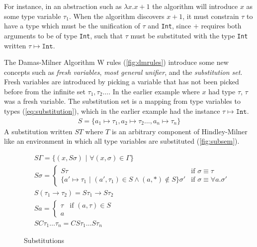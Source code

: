 \documentclass[11pt,oneside,a4paper]{report}
\begin{document}
For instance, in an abstraction such as $\lambda x.x + 1$ the algorithm will introduce $x$ as some type variable $\tau_1$.
When the algorithm discovers $x + 1$, it must constrain $\tau$ to have a type which must be the unification of $\tau$ and \texttt{Int}, since $+$ requires both arguments to be of type \texttt{Int}, such that $\tau$ must be substituted with the type \texttt{Int} written $\tau \mapsto \texttt{Int}$.

The Damas-Milner Algorithm W rules (\autoref{fig:dmrules}) introduce some new concepts such as \textit{fresh variables}, \textit{most general unifier}, and the \textit{substitution set}.
Fresh variables are introduced by picking a variable that has not been picked before from the infinite set $\tau_1, \tau_2 \dots $.
In the earlier example where $x$ had type $\tau$, $\tau$ was a fresh variable.
The substitution set is a mapping from type variables to types (\autoref{eq:substitution}), which in the earlier example had the instance $\tau \mapsto \texttt{Int}$.
\begin{align}
    S = \{ a_1 \mapsto \tau_1, a_2 \mapsto \tau_2 \dots , a_n \mapsto \tau_n \} 
    \label{eq:substitution}
\end{align}
A substitution written $S T$ where $T$ is an arbitrary component of Hindley-Milner like an environment in which all type variables are substituted (\autoref{fig:subsem}).
\begin{figure}
\begin{mdframed}
\begin{align}
    &S \Gamma = \{ (x, S \sigma) \,\,|\,\, \forall (x, \sigma) \in \Gamma \} \tag{Environment}\\
    &S \sigma  = 
        \begin{cases}
            S \tau & \text{if } \sigma \equiv \tau\\
            \{ a' \mapsto \tau_1 \,\,|\,\, (a', \tau_1) \in S \land (a, *) \notin S \} \sigma' & \text{if } \sigma \equiv \forall a . \sigma'
        \end{cases}
    \tag{Poly}\\
    &S (\tau_1 \rightarrow \tau_2) = S\tau_1 \rightarrow S\tau_2 \tag{Arrow}\\
    &S a = 
        \begin{cases}
            \tau & \text{if } (a, \tau) \in S\\
            a & 
        \end{cases}
    \tag{Typevariable}\\
    &S C \tau_1 \dots \tau_n = C S\tau_1 \dots S\tau_n \tag{Constructor}
\end{align}
\end{mdframed}
    \caption{Substitutions}
    \label{fig:subsem}
\end{figure}
\end{document}
